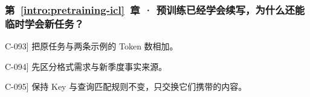 \subsubsection*{第~\ref*{intro:pretraining-icl}~章 · 预训练已经学会续写，为什么还能临时学会新任务？}
\begin{answerhints}
\item[\hyperref[exercise:icl-context-budget]{C-093}] \leavevmode{}\label{hint:icl-context-budget}把原任务与两条示例的 Token 数相加。
\item[\hyperref[exercise:prompt-or-training]{C-094}] \leavevmode{}\label{hint:prompt-or-training}先区分格式需求与新季度事实来源。
\item[\hyperref[exercise:icl-query-transfer]{C-095}] \leavevmode{}\label{hint:icl-query-transfer}保持 Key 与查询匹配规则不变，只交换它们携带的内容。
\end{answerhints}
